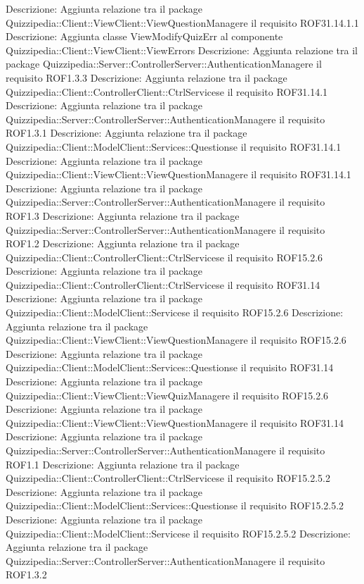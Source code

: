Descrizione: Aggiunta relazione tra il package Quizzipedia::Client::ViewClient::ViewQuestionManagere il requisito ROF31.14.1.1 
Descrizione: Aggiunta classe ViewModifyQuizErr al componente Quizzipedia::Client::ViewClient::ViewErrors 
Descrizione: Aggiunta relazione tra il package Quizzipedia::Server::ControllerServer::AuthenticationManagere il requisito ROF1.3.3 
Descrizione: Aggiunta relazione tra il package Quizzipedia::Client::ControllerClient::CtrlServicese il requisito ROF31.14.1 
Descrizione: Aggiunta relazione tra il package Quizzipedia::Server::ControllerServer::AuthenticationManagere il requisito ROF1.3.1 
Descrizione: Aggiunta relazione tra il package Quizzipedia::Client::ModelClient::Services::Questionse il requisito ROF31.14.1 
Descrizione: Aggiunta relazione tra il package Quizzipedia::Client::ViewClient::ViewQuestionManagere il requisito ROF31.14.1 
Descrizione: Aggiunta relazione tra il package Quizzipedia::Server::ControllerServer::AuthenticationManagere il requisito ROF1.3 
Descrizione: Aggiunta relazione tra il package Quizzipedia::Server::ControllerServer::AuthenticationManagere il requisito ROF1.2 
Descrizione: Aggiunta relazione tra il package Quizzipedia::Client::ControllerClient::CtrlServicese il requisito ROF15.2.6 
Descrizione: Aggiunta relazione tra il package Quizzipedia::Client::ControllerClient::CtrlServicese il requisito ROF31.14 
Descrizione: Aggiunta relazione tra il package Quizzipedia::Client::ModelClient::Servicese il requisito ROF15.2.6 
Descrizione: Aggiunta relazione tra il package Quizzipedia::Client::ViewClient::ViewQuestionManagere il requisito ROF15.2.6 
Descrizione: Aggiunta relazione tra il package Quizzipedia::Client::ModelClient::Services::Questionse il requisito ROF31.14 
Descrizione: Aggiunta relazione tra il package Quizzipedia::Client::ViewClient::ViewQuizManagere il requisito ROF15.2.6 
Descrizione: Aggiunta relazione tra il package Quizzipedia::Client::ViewClient::ViewQuestionManagere il requisito ROF31.14 
Descrizione: Aggiunta relazione tra il package Quizzipedia::Server::ControllerServer::AuthenticationManagere il requisito ROF1.1 
Descrizione: Aggiunta relazione tra il package Quizzipedia::Client::ControllerClient::CtrlServicese il requisito ROF15.2.5.2 
Descrizione: Aggiunta relazione tra il package Quizzipedia::Client::ModelClient::Services::Questionse il requisito ROF15.2.5.2 
Descrizione: Aggiunta relazione tra il package Quizzipedia::Client::ModelClient::Servicese il requisito ROF15.2.5.2 
Descrizione: Aggiunta relazione tra il package Quizzipedia::Server::ControllerServer::AuthenticationManagere il requisito ROF1.3.2 
